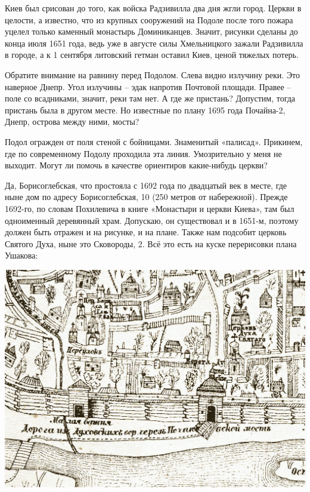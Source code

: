 Киев был срисован до того, как войска Радзивилла два дня жгли город. Церкви в целости, а известно, что из крупных сооружений на Подоле после того пожара уцелел только каменный монастырь Доминиканцев. Значит, рисунки сделаны до конца июля 1651 года, ведь уже в августе силы Хмельницкого зажали Радзивилла в городе, а к 1 сентября литовский гетман оставил Киев, ценой тяжелых потерь.

Обратите внимание на равнину перед Подолом. Слева видно излучину реки. Это наверное Днепр. Угол излучины – эдак напротив Почтовой площади. Правее – поле со всадниками, значит, реки там нет. А где же пристань? Допустим, тогда пристань была в другом месте. Но известные по плану 1695 года Почайна-2, Днепр, острова между ними, мосты?

Подол огражден от поля стеной с бойницами. Знаменитый «палисад». Прикинем, где по современному Подолу проходила эта линия. Умозрительно у меня не выходит. Могут ли помочь в качестве ориентиров какие-нибудь церкви? 

Да, Борисоглебская, что простояла с 1692 года по двадцатый век в месте, где ныне дом по адресу Борисоглебская, 10 (250 метров от набережной). Прежде 1692-го, по словам Похилевича в книге «Монастыри и церкви Киева», там был одноименный деревянный храм. Допускаю, он существовал и в 1651-м, поэтому должен быть отражен и на рисунке, и на плане. Также нам подсобит церковь Святого Духа, ныне это Сковороды, 2. Всё это есть на куске перерисовки плана Ушакова: 

\begin{center}
\includegraphics[width=\linewidth]{chast-colebanie-osnov/gora-zamkovaya-valovaya/boris.jpg}
\end{center}

